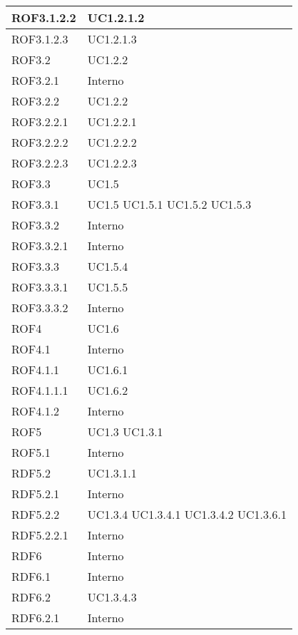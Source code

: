 \begin{center}
\begin{longtable}{| p{4cm} | p{4cm} |}
		\hline
		ROF3.1.2.2  &  UC1.2.1.2 \\
		\hline
		ROF3.1.2.3  &  UC1.2.1.3 \\
		\hline
		ROF3.2  &  UC1.2.2  \\
		\hline
		ROF3.2.1  &  Interno \\
		\hline
		ROF3.2.2  &  UC1.2.2 \\
		\hline
		ROF3.2.2.1  &  UC1.2.2.1 \\
		\hline
		ROF3.2.2.2  &  UC1.2.2.2 \\
		\hline
		ROF3.2.2.3  &  UC1.2.2.3 \\
		\hline				
		ROF3.3  &  UC1.5 \\
		\hline
		ROF3.3.1  &  UC1.5 \newline UC1.5.1 \newline UC1.5.2 \newline UC1.5.3 \\
		\hline
		ROF3.3.2  &  Interno \\
		\hline
		ROF3.3.2.1  &  Interno \\
		\hline
		ROF3.3.3  &  UC1.5.4 \\
		\hline
		ROF3.3.3.1  &  UC1.5.5 \\
		\hline
		ROF3.3.3.2  &  Interno \\
		\hline
		ROF4  &  UC1.6 \\
		\hline
		ROF4.1  &  Interno \\
		\hline
		ROF4.1.1  &  UC1.6.1 \\
		\hline
		ROF4.1.1.1  &  UC1.6.2 \\
		\hline
		ROF4.1.2  &  Interno \\
		\hline
		ROF5  &  UC1.3 \newline UC1.3.1 \\
		\hline
		ROF5.1  &  Interno \\
		\hline
		RDF5.2  &  UC1.3.1.1 \\
		\hline
		RDF5.2.1  &  Interno \\
		\hline
		RDF5.2.2  &  UC1.3.4 \newline UC1.3.4.1 \newline UC1.3.4.2 \newline UC1.3.6.1 \\
		\hline
		RDF5.2.2.1  &  Interno \\
		\hline
		RDF6  &  Interno \\
		\hline
		RDF6.1  &  Interno \\
		\hline
		RDF6.2  &  UC1.3.4.3 \\
		\hline
		RDF6.2.1  &  Interno \\

\end{longtable}
\end{center}
